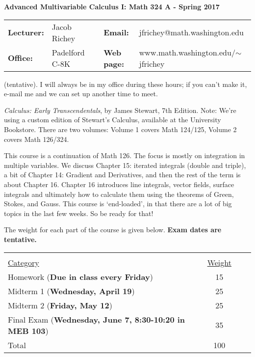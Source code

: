 \documentclass[11 pt]{report}
\begin{document}
\centerline{\bf Advanced Multivariable Calculus I: Math 324 A - Spring 2017}
\vspace{0.2cm}
\begin{tabular}{lllll}
{\bf Lecturer: }    & Jacob Richey &  & {\bf Email: }       & jfrichey@math.washington.edu \\
{\bf Office: }      & Padelford C-8K        &  & {\bf Web page: }    & www.math.washington.edu/$\sim$jfrichey \\
\end{tabular}
\vspace{0.25cm}

 (tentative).  
I will always be in my office during these hours; if you can't make it, e-mail me and we can set up another time to meet.  \vspace{0.25cm}

 \emph{Calculus: Early Transcendentals}, by James Stewart, 7th
Edition. Note: We're using a custom edition of Stewart's Calculus,
available at the University Bookstore.  There are two volumes:
Volume 1 covers Math 124/125, Volume 2 covers Math 126/324. 

\vspace{0.25cm}

  This course is a continuation of
Math 126.  The focus is mostly on integration in multiple variables.
We discuss Chapter 15: iterated integrals (double and triple), a bit
of Chapter 14: Gradient and Derivatives, and then the rest of the
term is about Chapter 16.  Chapter 16 introduces line integrals,
vector fields, surface integrals and ultimately how to calculate
them using the theorems of Green, Stokes, and Gauss.  This course is
`end-loaded', in that there are a lot of big topics in the last few
weeks.  So be ready for that!

\vspace{0.25cm}

 The weight for each part of the course is given
below. \textbf{Exam dates are tentative.}

\vspace{-.25in}

\begin{center}\begin{tabular}{lccl} &  \\
\underline{Category} & \underline{Weight}  \\
Homework   ({\bf Due in class every Friday})                 & 15  \\
Midterm 1  ({\bf Wednesday, April 19})                   & 25  \\
Midterm 2  ({\bf Friday, May 12})                   & 25   \\
Final Exam ({\bf Wednesday, June 7, 8:30-10:20 in MEB 103})                        & 35  \\
\hline Total                                        & 100
\end{tabular}
\end{center}
\end{document}

